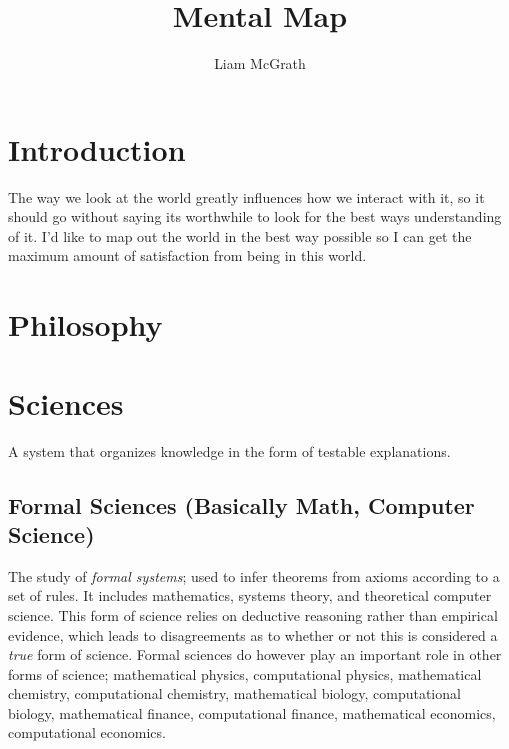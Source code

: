 \documentclass{article}
\title{Mental Map}
\author{Liam McGrath}
\begin{document}
\maketitle

\newpage 

\tableofcontents

\newpage

\section{Introduction}

The way we look at the world greatly influences how we interact with it, so it should go without saying its worthwhile to look for the best ways understanding of it. I'd like to map out the world in the best way possible so I can get the maximum amount of satisfaction from being in this world. 

\newpage

\section{Philosophy}

\newpage

\section{Sciences}

A system that organizes knowledge in the form of testable explanations. 

\subsection{Formal Sciences (Basically Math, Computer Science)}

The study of \textit{formal systems}; used to infer theorems from axioms according to a set of rules. It includes mathematics, systems theory, and theoretical computer science. This form of science relies on deductive reasoning rather than empirical evidence, which leads to disagreements as to whether or not this is considered a \textit{true} form of science. Formal sciences do however play an important role in other forms of science; mathematical physics, computational physics, mathematical chemistry, computational chemistry, mathematical biology, computational biology, mathematical finance, computational finance, mathematical economics, computational economics. 

\newpage
\end{document}
